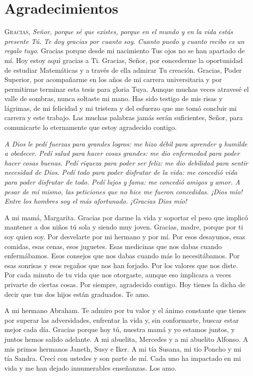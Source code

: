 \chapter*{Agradecimientos}
   
   \lettrine[lines=9] {\initfamily  \selectfont G}{racias},\textit{ Señor, porque sé que existes, porque en el mundo y en la vida estás presente Tú. Te doy gracias por cuanto soy. Cuanto puedo y cuanto recibo es un regalo tuyo}. Gracias porque desde mi nacimiento Tus ojos no se han apartado de mí. Hoy estoy aquí gracias a Ti. Gracias, Señor, por concederme la oportunidad de estudiar Matemáticas y a través de ella admirar Tu creación. Gracias, Poder Superior, por acompañarme en los años de mi carrera universitaria y por permitirme terminar esta tesis para gloria Tuya. Aunque muchas veces atravesé el valle de sombras, nunca soltaste mi mano. Has sido testigo de mis risas y lágrimas, de mi felicidad y mi tristeza y del esfuerzo que me tomó concluir mi carrera y este trabajo. Las muchas palabras jamás serán suficientes, Señor, para comunicarte lo eternamente que estoy agradecido contigo.


\textit{A Dios le pedí fuerzas para grandes logros: me hizo débil para aprender y humilde a obedecer. Pedí salud para hacer cosas grandes: me dio enfermedad para poder hacer cosas buenas. Pedí riqueza para poder ser feliz: me dio debilidad para sentir necesidad de Dios. Pedí todo para poder disfrutar de la vida: me concedió vida para poder disfrutar de todo. Pedí lujos y fama: me concedió amigos y amor. A pesar de mí mismo, las peticiones que no hice me fueron concedidas. ¡Dios mío! Entre los hombres soy el más afortunado. ¡Gracias Dios mío!}



A mi mamá, Margarita. Gracias por darme la vida y soportar el peso que implicó mantener a dos niños tú sola y siendo muy joven. Gracias, madre, porque por ti soy quien soy. Por desvelarte por mi hermano y por mí. Por esos desayunos, esas comidas, esas cenas, esos juguetes. Esas medicinas que nos dabas cuando enfermábamos. Esos consejos que nos dabas cuando más lo necesitábamos. Por esas sonrisas y esos regaños que nos han forjado. Por los valores que nos diste. Por cada minuto de tu vida que nos otorgaste, aunque eso implicara a veces privarte de ciertas cosas. Por siempre, agradecido contigo. Hoy tienes la dicha de decir que tus dos hijos están graduados. Te amo.


A mi hermano Abraham. Te admiro por tu valor y el ánimo constante que tienes por superar las adversidades, enfrentar la vida y, sin conformarte, buscar estar mejor cada día. Gracias porque hoy tú, nuestra mamá y yo estamos juntos, y juntos hemos salido adelante. 
A mi abuelita, Mercedes y a mi abuelito Alfonso. A mis primos hermanos Janeth, Susy e Iker.  A mi tía Susana, mi tío Poncho y mi tía Sandra. Crecí con ustedes y son parte de mí. Cada uno ha impactado en mi vida y me han dejado innumerables enseñanzas. Los amo.


